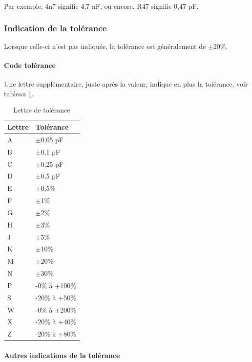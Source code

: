\documentclass[a4paper]{article}
\begin{document}
Par exemple, \og{}4n7\fg{} signifie 4,7 nF, ou encore, \og{}R47\fg{} signifie 0,47 pF.

\subsubsection{Indication de la tolérance}

Lorsque celle-ci n'est pas indiquée, la tolérance est généralement de $\pm$20\%.

\paragraph{Code tolérance}

Une lettre supplémentaire, juste après la valeur, indique en plus la tolérance, voir tableau \ref{Lettre_de_tolerance}.

\begin{table}[H]
	\centering
		\begin{tabular}{|l|l|}\hline
				Lettre & Tolérance\\\hline\hline
				A	& $\pm$0,05 pF\\\hline
				B	& $\pm$0,1 pF\\\hline
				C	& $\pm$0,25 pF\\\hline
				D	& $\pm$0,5 pF\\\hline
				E	& $\pm$0,5\%\\\hline
				F	& $\pm$1\%\\\hline
				G	& $\pm$2\%\\\hline
				H	& $\pm$3\%\\\hline
				J	& $\pm$5\%\\\hline
				K	& $\pm$10\%\\\hline
				M	& $\pm$20\%\\\hline
				N	& $\pm$30\%\\\hline
				P	& -0\% à +100\%\\\hline
				S	& -20\% à +50\%\\\hline
				W	& -0\% à +200\%\\\hline
				X	& -20\% à +40\%\\\hline
				Z	& -20\% à +80\%\\\hline
		\end{tabular}
	\caption{Lettre de tolérance
		\label{Lettre_de_tolerance}}
\end{table}

\paragraph{Autres indications de la tolérance}
\end{document}

